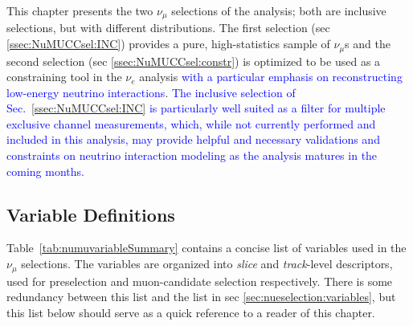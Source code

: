 \label{sec:NuMUCCsel}

\par This chapter presents the two $\nu_{\mu}$ selections of the analysis; both are inclusive selections, but with different distributions. The first selection (sec \ref{ssec:NuMUCCsel:INC}) provides a pure, high-statistics sample of $\nu_{\mu}$s and the second selection (sec \ref{ssec:NuMUCCsel:constr}) is optimized to be used as a constraining tool in the $\nu_e$ analysis \textcolor{blue}{with a particular emphasis on reconstructing low-energy neutrino interactions}. 
\textcolor{blue}{The inclusive selection of Sec.~\ref{ssec:NuMUCCsel:INC} is particularly well suited as a filter for multiple exclusive channel measurements, which, while not currently performed and included in this analysis, may provide helpful and necessary validations and constraints on neutrino interaction modeling as the analysis matures in the coming months.}

\subsection{Variable Definitions}
\label{ssec:NuMUCCsel:sel:vars}

\par Table~\ref{tab:numuvariableSummary} contains a concise list of variables used in the $\nu_{\mu}$ selections. The variables are organized into \textit{slice} and \textit{track}-level descriptors, used for preselection and muon-candidate selection respectively. There is some redundancy between this list and the list in sec \ref{sec:nueselection:variables}, but this list below should serve as a quick reference to a reader of this chapter.


